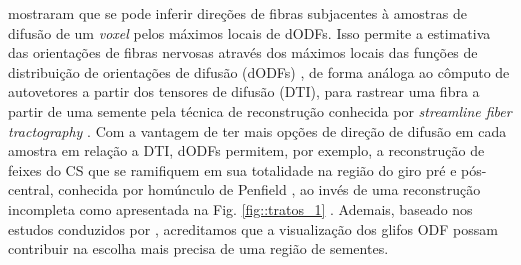 
 mostraram que se pode inferir direções de fibras subjacentes à amostras de difusão de um \textit{voxel} pelos máximos locais de dODFs. Isso permite a estimativa das orientações de fibras nervosas através dos máximos locais das funções de distribuição de orientações de difusão (dODFs) \cite{descoteaux2007, chamberland2014}, de forma análoga ao cômputo de autovetores a partir dos tensores de difusão (DTI), para rastrear uma fibra a partir de uma semente pela técnica de reconstrução conhecida por \textit{streamline fiber tractography} \cite{Mori1999}. Com a vantagem de ter mais opções de direção de difusão em cada amostra em relação a DTI, dODFs permitem, por exemplo, a reconstrução de feixes do CS que se ramifiquem em sua totalidade na região do giro pré e pós-central, conhecida por homúnculo de Penfield \cite{wang2019}, ao invés de uma reconstrução incompleta como apresentada na Fig. \ref{fig::tratos_1} \cite{bucci2013}. Ademais, baseado nos estudos conduzidos por , acreditamos que a visualização dos glifos ODF possam contribuir na escolha mais precisa de uma região de sementes.


